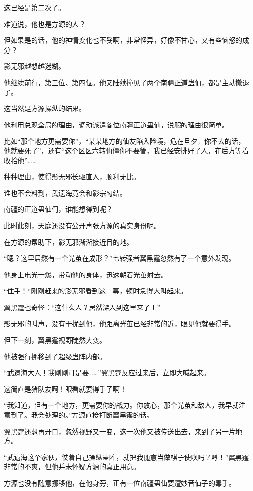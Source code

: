 \begin{this_body}
这已经是第二次了。

难道说，他也是方源的人？

但如果是的话，他的神情变化也不妥啊，非常怪异，好像不甘心，又有些恼怒的成分？

影无邪越想越迷糊。

他继续前行，第三位、第四位。他又陆续撞见了两个南疆正道蛊仙，都是主动撤退了。

这当然是方源操纵的结果。

他利用总观全局的理由，调动派遣各位南疆正道蛊仙，说服的理由很简单。

比如“那个地方更需要你”，“某某地方的仙友陷入险境，危在旦夕，你不去的话，他就要死了”，还有“这个区区六转仙僵你不要管，我已经安排好了人，在后方等着收拾他”……

种种理由，使得影无邪长驱直入，顺利无比。

谁也不会料到，武遗海竟会和影宗勾结。

南疆的正道蛊仙们，谁能想得到呢？

此时此刻，天庭还没有公开声张方源的真实身份呢。

在方源的帮助下，影无邪渐渐接近目的地。

“嗯？这里居然有一个光茧在成形？”七转强者翼黑霆忽然有了一个意外发现。

他身上电光一爆，带动他的身体，迅速朝着光茧射去。

“住手！”刚刚赶来的影无邪看到这一幕，顿时急得大叫起来。

翼黑霆也奇怪：“这什么人？居然深入到这里来了！”

影无邪的叫声，没有干扰到他，他距离光茧已经非常的近，眼见他就要得手。

但下一刻，翼黑霆视野陡然大变。

他被强行挪移到了超级蛊阵内部。

“武遗海大人！我刚刚可是要……”翼黑霆反应过来后，立即大喊起来。

这简直是猪队友啊！眼看就要得手了啊！

“我知道，但有一个地方，更需要你的战力。你放心，那个光茧和敌人，我早就注意到了。我会处理的。”方源直接打断翼黑霆的话。

翼黑霆还想再开口，忽然视野又一变，这一次他又被传送出去，来到了另一片地方。

“武遗海这个家伙，仗着自己操纵蛊阵，就把我随意当做棋子使唤吗？哼！”翼黑霆非常的不爽，但他并未怀疑方源的真正用意。

方源也没有随意挪移他，在他身旁，正有一位南疆蛊仙要遭妙音仙子的毒手。


\end{this_body}
